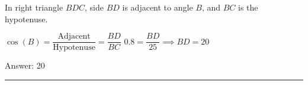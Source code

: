 \documentclass[11pt,paper=a4,answers]{exam}
\begin{document}
\begin{questions}
\begin{solution}
In right triangle $BDC$, side $BD$ is adjacent to angle $B$, and $BC$ is the hypotenuse.
\vspace{5pt}
\begin{center}
$\cos(B) = \dfrac{\text{Adjacent}}{\text{Hypotenuse}} = \dfrac{BD}{BC}$
\vspace{5pt}
$0.8 = \dfrac{BD}{25} \implies BD = 20$
\end{center}
\vspace{5pt}
Answer: \colorbox{yellow!100}{20}
\end{solution}



\end{questions}
\begin{center}
\rule{.5\textwidth}{1pt}
\end{center}
\end{document}
